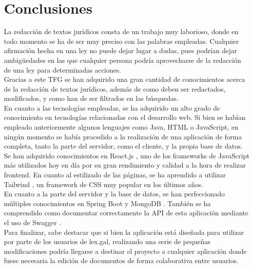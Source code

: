 \section{Conclusiones}

La redacción de textos jurídicos consta de un trabajo muy laborioso, donde en todo momento se ha de ser muy preciso con las palabras empleadas. Cualquier afirmación hecha en una ley no puede dejar lugar a dudas, pues podrían dejar ambigüedades en las que cualquier persona podría aprovecharse de la redacción de una ley para determinadas acciones.
\\

Gracias a este TFG se han adquirido una gran cantidad de conocimientos acerca de la redacción de textos jurídicos, además de como deben ser redactados, modificados, y como han de ser filtrados en las búsquedas.
\\

En cuanto a las tecnologías empleadas, se ha adquirido un alto grado de conocimiento en tecnologías relacionadas con el desarrollo web. Si bien se habían empleado anteriormente algunos lenguajes como Java, HTML o JavaScript, en ningún momento se había procedido a la realización de una aplicación de forma completa, tanto la parte del servidor, como el cliente, y la propia base de datos.
\\

Se han adquirido conocimientos en React.js \cite{react}, uno de los frameworks de JavaScript más utilizados hoy en día por su gran rendimiento y calidad a la hora de realizar frontend. En cuanto al estilizado de las páginas, se ha aprendido a utilizar Tailwind \cite{tailwind}, un framework de CSS muy popular en los últimos años.
\\

En cuanto a la parte del servidor y la base de datos, se han perfeccionado múltiples conocimientos en Spring Boot \cite{spring} y MongoDB \cite{mongodb}. También se ha comprendido como documentar correctamente la API de esta aplicación mediante el uso de Swagger \cite{swagger}.
\\

Para finalizar, cabe destacar que si bien la aplicación está diseñada para utilizar por parte de los usuarios de lex.gal, realizando una serie de pequeñas modificaciones podría llegarse a destinar el proyecto a cualquier aplicación donde fuese necesaria la edición de documentos de forma colaborativa entre usuarios.